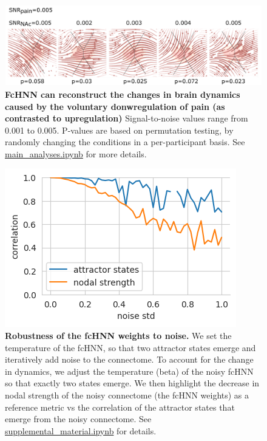 \documentclass{article}
\begin{document}
\begin{figure}[!htbp]
\centering
\includegraphics[width=0.7\linewidth]{files/si_downreg_trajector-f9d7627a4664f8d8cab2fc2b482d0386.png}
\caption[]{\textbf{FcHNN can reconstruct the changes in brain dynamics caused by the voluntary donwregulation of pain (as contrasted to upregulation)}
Signal-to-noise values range from 0.001 to 0.005. P-values are based on permutation testing, by randomly changing the conditions in a per-participant basis. See \href{https://github.com/pni-lab/connattractor/blob/master/notebooks/main\_analyses.ipynb}{main\_analyses.ipynb} for more details.}
\label{si_downreg_trajectory_sim}
\end{figure}

\begin{figure}[!htbp]
\centering
\includegraphics[width=0.7\linewidth]{files/noise_robustness_wei-64972fc9f4e856fad203388a17ef5b0c.png}
\caption[]{\textbf{Robustness of the fcHNN weights to noise.}
We set the temperature of the fcHNN, so that two attractor states emerge and iteratively add noise to the connectome.
To account for the change in dynamics, we adjust the temperature (beta) of the noisy fcHNN so that exactly two states emerge. We then highlight the decrease in nodal strength of the noisy connectome (the fcHNN weights) as a reference metric
vs the correlation of the attractor states that emerge from the noisy connectome. See \href{https://github.com/pni-lab/connattractor/blob/master/notebooks/supplemental\_material.ipynb}{supplemental\_material.ipynb} for details.}
\label{si_noise_robustness_weights}
\end{figure}
\end{document}
